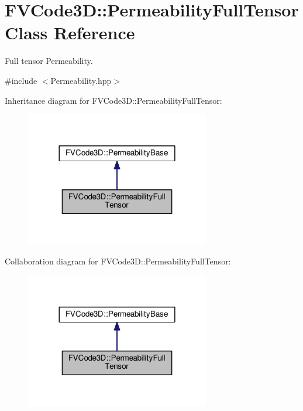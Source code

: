 \hypertarget{classFVCode3D_1_1PermeabilityFullTensor}{}\section{F\+V\+Code3D\+:\+:Permeability\+Full\+Tensor Class Reference}
\label{classFVCode3D_1_1PermeabilityFullTensor}


Full tensor Permeability.  




{\ttfamily \#include $<$Permeability.\+hpp$>$}



Inheritance diagram for F\+V\+Code3D\+:\+:Permeability\+Full\+Tensor\+:
\nopagebreak
\begin{figure}[H]
\begin{center}
\leavevmode
\includegraphics[width=228pt]{classFVCode3D_1_1PermeabilityFullTensor__inherit__graph}
\end{center}
\end{figure}


Collaboration diagram for F\+V\+Code3D\+:\+:Permeability\+Full\+Tensor\+:
\nopagebreak
\begin{figure}[H]
\begin{center}
\leavevmode
\includegraphics[width=228pt]{classFVCode3D_1_1PermeabilityFullTensor__coll__graph}
\end{center}
\end{figure}
